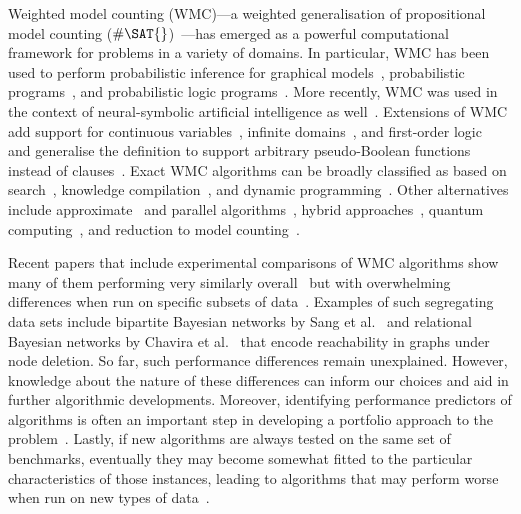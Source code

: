 \documentclass[runningheads]{llncs}
\begin{document}
Weighted model counting (\textsf{WMC})---a weighted generalisation of
propositional model counting
($\#\SAT{}$)~\cite{DBLP:journals/ai/ChaviraD08}---has emerged as a powerful
computational framework for problems in a variety of domains. In particular,
\textsf{WMC} has been used to perform probabilistic inference for graphical
models~\cite{DBLP:conf/ecai/BartKLM16,DBLP:conf/ijcai/ChaviraD05,DBLP:conf/sat/ChaviraD06,DBLP:conf/kr/Darwiche02,DBLP:conf/aaai/SangBK05},
probabilistic programs~\cite{DBLP:journals/pacmpl/HoltzenBM20}, and
probabilistic logic programs~\cite{DBLP:journals/tplp/FierensBRSGTJR15}. More
recently, \textsf{WMC} was used in the context of neural-symbolic artificial
intelligence as well~\cite{DBLP:conf/icml/XuZFLB18}. Extensions of \textsf{WMC}
add support for continuous variables~\cite{DBLP:conf/ijcai/BellePB15}, infinite
domains~\cite{DBLP:conf/aaai/Belle17}, and first-order
logic~\cite{DBLP:journals/cacm/GogateD16,DBLP:conf/ijcai/BroeckTMDR11} and
generalise the definition to support arbitrary pseudo-Boolean functions instead
of clauses~\cite{DBLP:conf/sat/DilkasB21}. Exact \textsf{WMC} algorithms can be
broadly classified as based on
search~\cite{DBLP:conf/sat/SangBBKP04,DBLP:conf/ijcai/SharmaRSM19}, knowledge
compilation~\cite{DBLP:conf/ecai/Darwiche04,DBLP:conf/ijcai/LagniezM17,DBLP:conf/ijcai/OztokD15},
and dynamic programming~\cite{DBLP:conf/aaai/DudekPV20,DBLP:conf/cp/DudekPV20}.
Other alternatives include approximate~\cite{DBLP:conf/aaai/RenkensKBR14} and
parallel algorithms~\cite{DBLP:conf/pgm/DalLL18,DBLP:conf/esa/FichteHWZ18},
hybrid approaches~\cite{DBLP:conf/sat/HecherTW20}, quantum
computing~\cite{DBLP:conf/ecai/Riguzzi20}, and reduction to model
counting~\cite{DBLP:conf/ijcai/ChakrabortyFMV15}.

Recent papers that include experimental comparisons of \textsf{WMC}
algorithms show many of them performing very similarly
overall~\cite{DBLP:conf/aaai/DudekPV20,DBLP:conf/cp/DudekPV20} but with
overwhelming differences when run on specific subsets of
data~\cite{DBLP:conf/uai/DilkasB21,DBLP:conf/sat/DilkasB21,DBLP:conf/ijcai/LagniezM17}.
Examples of such segregating data sets include bipartite Bayesian networks by
Sang et al.~\cite{DBLP:conf/aaai/SangBK05} and
relational Bayesian networks by
Chavira et al.~\cite{DBLP:journals/ijar/ChaviraDJ06}
that encode reachability in graphs under node deletion. So far, such performance
differences remain unexplained. However, knowledge about the nature of these
differences can inform our choices and aid in further algorithmic developments.
Moreover, identifying performance predictors of algorithms is often an important
step in developing a portfolio approach to the
problem~\cite{DBLP:journals/jair/XuHHL08}. Lastly, if new algorithms are always
tested on the same set of benchmarks, eventually they may become somewhat fitted
to the particular characteristics of those instances, leading to algorithms that
may perform worse when run on new types of
data~\cite{DBLP:conf/cec/HossainALA10}.
\end{document}
